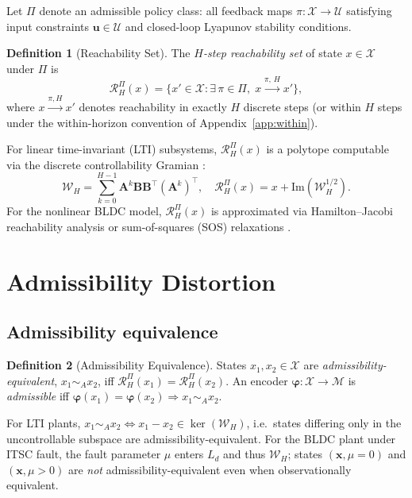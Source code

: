 \documentclass[10pt,twocolumn]{article}
\theoremstyle{plain}
\theoremstyle{definition}
\newtheorem{definition}{Definition}
\theoremstyle{remark}
\newcommand{\simA}{\sim_{\!A}}
\newcommand{\RHP}{\mathcal{R}_{H}^{\Pi}}
\newcommand{\calX}{\mathcal{X}}
\newcommand{\calM}{\mathcal{M}}
\newcommand{\bvphi}{\bm{\varphi}}
\begin{document}
Let $\Pi$ denote an admissible policy class: all feedback maps
$\pi: \calX \to \mathcal{U}$ satisfying input constraints
$\bm{u} \in \mathcal{U}$ and closed-loop Lyapunov stability conditions.

\begin{definition}[Reachability Set]
\label{def:reach}
The \emph{$H$-step reachability set} of state $x \in \calX$ under $\Pi$ is
\begin{equation}
  \RHP(x) = \bigl\{x' \in \calX : \exists\,\pi \in \Pi,\;
  x \xrightarrow{\pi,\,H} x'\bigr\},
\end{equation}
where $x \xrightarrow{\pi,H} x'$ denotes reachability in exactly $H$ discrete
steps (or within $H$ steps under the within-horizon convention of
Appendix~\ref{app:within}).
\end{definition}

For linear time-invariant (LTI) subsystems, $\RHP(x)$ is a polytope computable
via the discrete controllability Gramian \citep{kalman1960general}:
\begin{equation}
  \mathcal{W}_H = \sum_{k=0}^{H-1} \bm{A}^k \bm{B} \bm{B}^\top (\bm{A}^k)^\top,
  \quad
  \RHP(x) = x + \mathrm{Im}(\mathcal{W}_H^{1/2}).
  \label{eq:gramian}
\end{equation}
For the nonlinear BLDC model, $\RHP(x)$ is approximated via Hamilton--Jacobi
reachability analysis \citep{tomlin2003computational} or
sum-of-squares (SOS) relaxations \citep{parrilo2000structured}.

\section{Admissibility Distortion}

\subsection{Admissibility equivalence}

\begin{definition}[Admissibility Equivalence]
\label{def:admissibility}
States $x_1, x_2 \in \calX$ are \emph{admissibility-equivalent},
$x_1 \simA x_2$, iff $\RHP(x_1) = \RHP(x_2)$.
An encoder $\bvphi: \calX \to \calM$ is \emph{admissible} iff
$\bvphi(x_1)=\bvphi(x_2) \Rightarrow x_1 \simA x_2$.
\end{definition}

For LTI plants, $x_1 \simA x_2 \iff x_1 - x_2 \in \ker(\mathcal{W}_H)$,
i.e.\ states differing only in the uncontrollable subspace are
admissibility-equivalent. For the BLDC plant under ITSC fault, the fault
parameter $\mu$ enters $L_d$ and thus $\mathcal{W}_H$; states
$(\bm{x},\mu=0)$ and $(\bm{x},\mu>0)$ are \emph{not} admissibility-equivalent
even when observationally equivalent.
\end{document}
